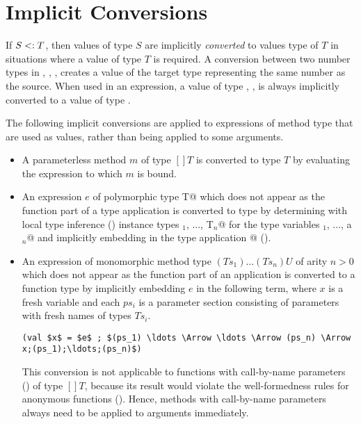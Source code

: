 \documentclass[11pt]{report}
\begin{document}
\section{Implicit Conversions}
\label{sec:impl-conv}

If $S <: T$, then values of type $S$ are implicitly {\em
converted} to values type of $T$ in situations where a value of type
$T$ is required. A conversion between two number types in \verb@int@,
\verb@long@, \verb@float@, \verb@double@ creates a value of the target
type representing the same number as the source.  When used in an
expression, a value of type \verb@byte@, \verb@char@, \verb@short@ is
always implicitly converted to a value of type \verb@int@.

The following implicit conversions are applied to expressions of
method type that are used as values, rather than being applied to some
arguments.
\begin{itemize}
\item
A parameterless method $m$ of type $[] T$
is converted to type $T$ by evaluating the expression to which $m$ is bound.
\item
An expression $e$ of polymorphic type 
\verb@[a$_1$ >: L$_1$ <: U$_1$, ..., a$_n$ >: L$_n$ <: U$_n$]T@
which does not appear as the function part of
a type application is converted to type \verb@T@
by determining with local type inference
() instance types \verb@T$_1$, ..., T$_n$@
for the type variables \verb@a$_1$, ..., a$_n$@ and
implicitly embedding \verb@e@ in the type application
\verb@e[U$_1$, ..., U$_n$]@ ().
\item
An expression \verb@e@ of monomorphic method type
$(Ts_1) \ldots (Ts_n) U$ of arity $n > 0$
which does not appear as the function part of an application is
converted to a function type by implicitly embedding $e$ in
the following term, where $x$ is a fresh variable and each $ps_i$ is a
parameter section consisting of parameters with fresh names of types $Ts_i$.

\begin{verbatim}
(val $x$ = $e$ ; $(ps_1) \ldots \Arrow \ldots \Arrow (ps_n) \Arrow x;(ps_1);\ldots;(ps_n)$)
\end{verbatim}
This conversion is not applicable to functions with call-by-name
parameters () of type $[]T$, because its result
would violate the well-formedness rules for anonymous functions
(). Hence, methods with call-by-name
parameters always need to be applied to arguments immediately.
\end{itemize}
\end{document}
